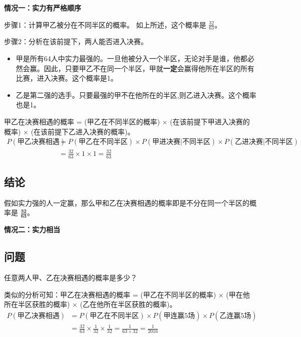 \documentclass{article}
\begin{document}
\textbf{情况一：实力有严格顺序}
\begin{description}
    \item 步骤1：计算甲乙被分在不同半区的概率。
    如上所述，这个概率是 $\frac{32}{63}$。
    \item 步骤2：分析在该前提下，两人能否进入决赛。
    \begin{itemize}
        \item 甲是所有64人中实力最强的。一旦他被分入一个半区，无论对手是谁，他都必然会赢。因此，只要甲乙不在同一个半区，甲就\textbf{一定}会赢得他所在半区的所有比赛，进入决赛。这个概率是1。
        \item 乙是第二强的选手。只要最强的甲不在他所在的半区,则乙进入决赛。这个概率也是1。
    \end{itemize}
    
    \item[步骤3：合并概率。]
    甲乙在决赛相遇的概率 = (甲乙在不同半区的概率) × (在该前提下甲进入决赛的概率) × (在该前提下乙进入决赛的概率)。
    \begin{align*}
        P(\text{甲乙决赛相遇}) &= P(\text{甲乙在不同半区}) \times P(\text{甲进决赛} | \text{不同半区}) \times P(\text{乙进决赛} | \text{不同半区}) \\
        &= \frac{32}{63} \times 1 \times 1 = \frac{32}{63}
    \end{align*}
\end{description}

\subsection*{结论}
假如实力强的人一定赢，那么甲和乙在决赛相遇的概率即是不分在同一个半区的概率是 $\mathbf{\frac{32}{63}}$。

\textbf{情况二：实力相当}
\subsection*{问题}
任意两人甲、乙在决赛相遇的概率是多少？

类似的分析可知：甲乙在决赛相遇的概率 = (甲乙在不同半区的概率) × (甲在他所在半区获胜的概率) × (乙在他所在半区获胜的概率)。
    \begin{align*}
        P(\text{甲乙决赛相遇}) &= P(\text{甲乙在不同半区}) \times P(\text{甲连赢5场}) \times P(\text{乙连赢5场}) \\
        &= \frac{32}{63} \times \frac{1}{32} \times \frac{1}{32} = \frac{1}{63 \times 32} = \frac{1}{2016}
    \end{align*}
\end{document}
